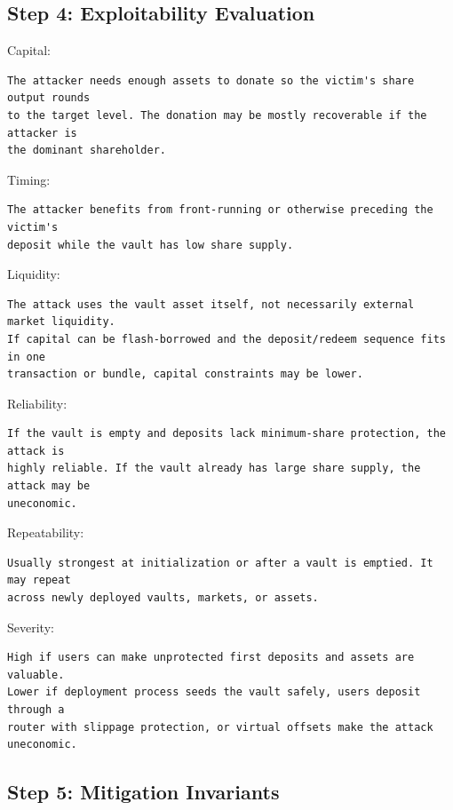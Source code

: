 \subsection{Step 4: Exploitability Evaluation}

Capital:

\begin{lstlisting}
The attacker needs enough assets to donate so the victim's share output rounds
to the target level. The donation may be mostly recoverable if the attacker is
the dominant shareholder.
\end{lstlisting}

Timing:

\begin{lstlisting}
The attacker benefits from front-running or otherwise preceding the victim's
deposit while the vault has low share supply.
\end{lstlisting}

Liquidity:

\begin{lstlisting}
The attack uses the vault asset itself, not necessarily external market liquidity.
If capital can be flash-borrowed and the deposit/redeem sequence fits in one
transaction or bundle, capital constraints may be lower.
\end{lstlisting}

Reliability:

\begin{lstlisting}
If the vault is empty and deposits lack minimum-share protection, the attack is
highly reliable. If the vault already has large share supply, the attack may be
uneconomic.
\end{lstlisting}

Repeatability:

\begin{lstlisting}
Usually strongest at initialization or after a vault is emptied. It may repeat
across newly deployed vaults, markets, or assets.
\end{lstlisting}

Severity:

\begin{lstlisting}
High if users can make unprotected first deposits and assets are valuable.
Lower if deployment process seeds the vault safely, users deposit through a
router with slippage protection, or virtual offsets make the attack uneconomic.
\end{lstlisting}

\subsection{Step 5: Mitigation Invariants}

